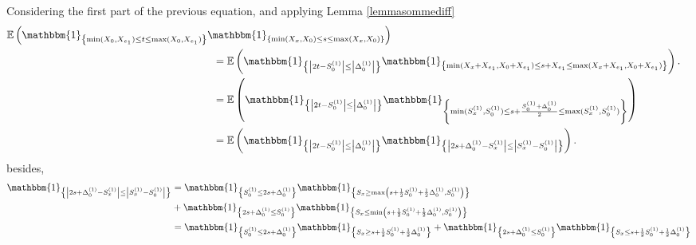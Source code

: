 \documentclass[12pt]{article}
\theoremstyle{Theorem}
\theoremstyle{definition}
\begin{document}
Considering the first part of the previous equation, and applying Lemma \ref{lemmasommediff}
{\small
\begin{align*}
\mathbb{E}\left(\mathbbm{1}_{\left\{\min(X_{\scriptscriptstyle 0}, X_{e_1}) \leq t \leq \max(X_{\scriptscriptstyle 0}, X_{e_1})\right\}}\mathbbm{1}_{\left\{\min(X_{\scriptscriptstyle x}, X_{0}) \leq s \leq \max(X_{\scriptscriptstyle x}, X_{0}) \right\}}\right)\\
& \hspace{-6cm} = \mathbb{E}\left(\mathbbm{1}_{\left\{ \left|2t - S^{\scriptscriptstyle (1)}_{\scriptscriptstyle 0}\right| \leq \left|\Delta^{\scriptscriptstyle (1)}_{\scriptscriptstyle 0}\right|\right\}}\mathbbm{1}_{\left\{\min(X_{\scriptscriptstyle x}+ X_{e_1}, X_{0} + X_{e_1}) \leq s + X_{e_1}\leq \max(X_{\scriptscriptstyle x} + X_{e_1}, X_{0} + X_{e_1}) \right\}}\right). \\
& \hspace{-6cm} = \mathbb{E}\left(\mathbbm{1}_{\left\{ \left|2t - S^{\scriptscriptstyle (1)}_{\scriptscriptstyle 0}\right| \leq \left|\Delta^{\scriptscriptstyle (1)}_{\scriptscriptstyle 0}\right|\right\}}\mathbbm{1}_{\left\{\min(S^{(1)}_{x}, S^{(1)}_{0}) \leq s + \frac{S^{(1)}_{0} + \Delta^{(1)}_{0}}{2}\leq \max(S^{(1)}_{x}, S^{(1)}_{0}) \right\}}\right) \\
& \hspace{-6cm} = \mathbb{E}\left(\mathbbm{1}_{\left\{ \left|2t - S^{\scriptscriptstyle (1)}_{\scriptscriptstyle 0}\right| \leq \left|\Delta^{\scriptscriptstyle (1)}_{\scriptscriptstyle 0}\right|\right\}}\mathbbm{1}_{\left\{ \left|2s + \Delta^{(1)}_{0} -  S^{\scriptscriptstyle (1)}_{x}  \right| \leq \left|S^{\scriptscriptstyle (1)}_{x} - S^{\scriptscriptstyle (1)}_{0}\right|\right\}}\right). 
\end{align*}}
besides, 
\begin{align*}
\mathbbm{1}_{\left\{ \left|2s + \Delta^{(1)}_{0} -  S^{\scriptscriptstyle (1)}_{x}  \right| \leq \left|S^{\scriptscriptstyle (1)}_{x} - S^{\scriptscriptstyle (1)}_{0}\right|\right\}} &= \mathbbm{1}_{\left\{  S^{\scriptscriptstyle (1)}_{0} \leq 2s + \Delta^{(1)}_{0}\right\}} \mathbbm{1}_{\left\{ S_{x} \geq  \max\left(s+ \frac{1}{2}S^{\scriptscriptstyle (1)}_{0} + \frac{1}{2}\Delta^{\scriptscriptstyle (1)}_{0}, S^{\scriptscriptstyle (1)}_{0}\right) \right\}} \\
& + \mathbbm{1}_{\left\{  2s + \Delta^{(1)}_{0} \leq S^{\scriptscriptstyle (1)}_{0} \right\}} \mathbbm{1}_{\left\{ S_{x} \leq  \min\left(s+ \frac{1}{2}S^{\scriptscriptstyle (1)}_{0} + \frac{1}{2}\Delta^{\scriptscriptstyle (1)}_{0}, S^{\scriptscriptstyle (1)}_{0}\right) \right\}} \\
&= \mathbbm{1}_{\left\{  S^{\scriptscriptstyle (1)}_{0} \leq 2s + \Delta^{(1)}_{0}\right\}} \mathbbm{1}_{\left\{ S_{x} \geq s+ \frac{1}{2}S^{\scriptscriptstyle (1)}_{0} + \frac{1}{2}\Delta^{\scriptscriptstyle (1)}_{0}\right\}} + \mathbbm{1}_{\left\{  2s + \Delta^{(1)}_{0} \leq S^{\scriptscriptstyle (1)}_{0} \right\}} \mathbbm{1}_{\left\{ S_{x} \leq  s+ \frac{1}{2}S^{\scriptscriptstyle (1)}_{0} + \frac{1}{2}\Delta^{\scriptscriptstyle (1)}_{0} \right\}} \\
\end{align*} 
\end{document}
